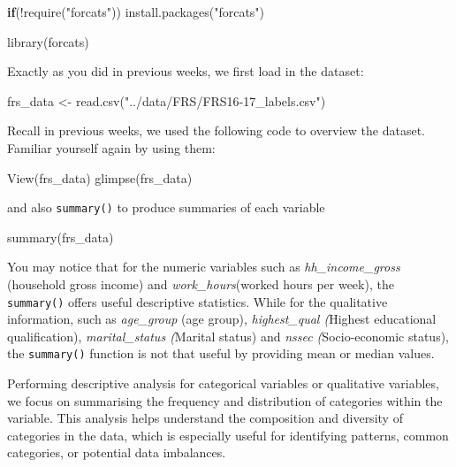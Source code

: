 \documentclass[
  letterpaper,
  DIV=11,
  numbers=noendperiod]{scrreprt}
\newenvironment{Shaded}{\begin{snugshade}}{\end{snugshade}}
\newcommand{\ControlFlowTok}[1]{\textcolor[rgb]{0.00,0.23,0.31}{\textbf{#1}}}
\newcommand{\FunctionTok}[1]{\textcolor[rgb]{0.28,0.35,0.67}{#1}}
\newcommand{\NormalTok}[1]{\textcolor[rgb]{0.00,0.23,0.31}{#1}}
\newcommand{\OtherTok}[1]{\textcolor[rgb]{0.00,0.23,0.31}{#1}}
\newcommand{\SpecialCharTok}[1]{\textcolor[rgb]{0.37,0.37,0.37}{#1}}
\newcommand{\StringTok}[1]{\textcolor[rgb]{0.13,0.47,0.30}{#1}}
\begin{document}
\begin{Shaded}
\begin{Highlighting}[]
\ControlFlowTok{if}\NormalTok{(}\SpecialCharTok{!}\FunctionTok{require}\NormalTok{(}\StringTok{"forcats"}\NormalTok{))}
  \FunctionTok{install.packages}\NormalTok{(}\StringTok{"forcats"}\NormalTok{)}

\FunctionTok{library}\NormalTok{(forcats)}
\end{Highlighting}
\end{Shaded}

Exactly as you did in previous weeks, we first load in the dataset:

\begin{Shaded}
\begin{Highlighting}[]
\NormalTok{frs\_data }\OtherTok{\textless{}{-}} \FunctionTok{read.csv}\NormalTok{(}\StringTok{"../data/FRS/FRS16{-}17\_labels.csv"}\NormalTok{)}
\end{Highlighting}
\end{Shaded}

Recall in previous weeks, we used the following code to overview the
dataset. Familiar yourself again by using them:

\begin{Shaded}
\begin{Highlighting}[]
\FunctionTok{View}\NormalTok{(frs\_data)}
\FunctionTok{glimpse}\NormalTok{(frs\_data)}
\end{Highlighting}
\end{Shaded}

and also \texttt{summary()} to produce summaries of each variable

\begin{Shaded}
\begin{Highlighting}[]
\FunctionTok{summary}\NormalTok{(frs\_data)}
\end{Highlighting}
\end{Shaded}

You may notice that for the numeric variables such as
\emph{hh\_income\_gross} (household gross income) and
\emph{work\_hours}(worked hours per week), the \texttt{summary()} offers
useful descriptive statistics. While for the qualitative information,
such as \emph{age\_group} (age group), \emph{highest\_qual (}Highest
educational qualification), \emph{marital\_status (}Marital status) and
\emph{nssec (}Socio-economic status), the \texttt{summary()} function is
not that useful by providing mean or median values.

Performing descriptive analysis for categorical variables or qualitative
variables, we focus on summarising the frequency and distribution of
categories within the variable. This analysis helps understand the
composition and diversity of categories in the data, which is especially
useful for identifying patterns, common categories, or potential data
imbalances.
\end{document}
